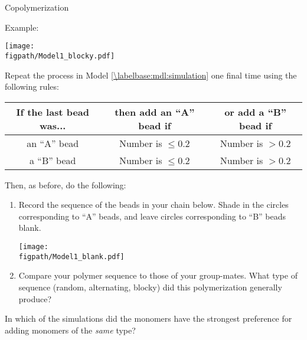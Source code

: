 \begin{activity}{Copolymerization}
\begin{ctqs}
\begin{enumerate}
\begin{solution}[1.5in]
{			Example:
			
				\centerline{\texttt{[image: \\figpath/Model1\_blocky.pdf]}}
				}\end{solution}
		\end{enumerate}
		
	\question \label{\labelbase:ctq:sim-biased} Repeat the process in Model \ref{\labelbase:mdl:simulation} one final time using the following rules:	\begin{center}
					\renewcommand{\arraystretch}{1.5}
					\begin{tabular}{|c|c|c|}
						\hline
						\textbf{If the last bead was...} &  \textbf{then add an ``A'' bead if} & \textbf{or add a ``B'' bead if}\\\hline
						 an ``A'' bead & Number is $\leq 0.2$ & Number is $> 0.2$ \\\hline
						 a ``B'' bead & Number is $\leq 0.2$ & Number is $> 0.2$ \\\hline
					\end{tabular}
					\end{center}
	
		Then, as before, do the following:
		\begin{enumerate}
			\item Record the sequence of the beads in your chain below.  Shade in the circles corresponding to ``A'' beads, and leave circles corresponding to ``B'' beads blank.
	
		\vspace{6pt}
		\centerline{\texttt{[image: \\figpath/Model1\_blank.pdf]}}
	
			\item Compare your polymer sequence to those of your group-mates.  What type of sequence (random, alternating, blocky) did this polymerization generally produce?
			
				\begin{solution}[1.25in]\end{solution}
		\end{enumerate}
		
	\question In which of the simulations did the monomers have the strongest preference for adding monomers of the \emph{same} type?
	

\end{ctqs}
\end{activity}

